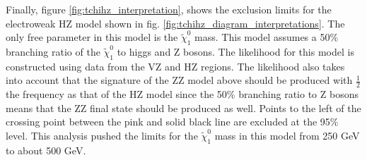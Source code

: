     Finally, figure \ref{fig:tchihz_interpretation}, shows the exclusion limits for the electroweak HZ model shown in fig. \ref{fig:tchihz_diagram_interpretations}. The only free parameter in this model is the $\widetilde{\chi}^0_1$ mass. This model assumes a 50\% branching ratio of the $\widetilde{\chi}^0_1$ to higgs and Z bosons. The likelihood for this model is constructed using data from the VZ and HZ regions. The likelihood also takes into account that the signature of the ZZ model above should be produced with $\frac{1}{2}$ the frequency as that of the HZ model since the 50\% branching ratio to Z bosons means that the ZZ final state should be produced as well. Points to the left of the crossing point between the pink and solid black line are excluded at the 95\% level. This analysis pushed the limits for the $\widetilde{\chi}^0_1$ mass in this model from 250 GeV to about 500 GeV.

